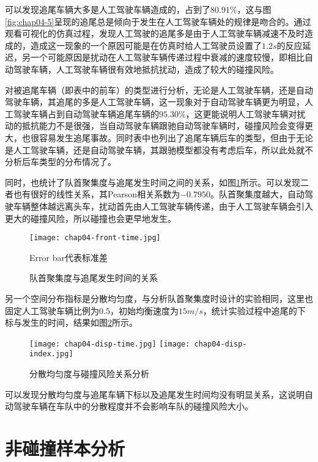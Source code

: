 可以发现追尾车辆大多是人工驾驶车辆造成的，占到了$80.91\%$，这与图\ref{fig:chap04-5}呈现的追尾总是倾向于发生在人工驾驶车辆处的规律是吻合的。通过观看可视化的仿真过程，发现人工驾驶的追尾多是由于人工驾驶车辆减速不及时造成的，造成这一现象的一个原因可能是在仿真时给人工驾驶员设置了$1.2s$的反应延迟，另一个可能原因是扰动在人工驾驶车辆传递过程中衰减的速度较慢，即相比自动驾驶车辆，人工驾驶车辆很有效地抵抗扰动，造成了较大的碰撞风险。

对被追尾车辆（即表中的前车）的类型进行分析，无论是人工驾驶车辆，还是自动驾驶车辆，其追尾的多是人工驾驶车辆，这一现象对于自动驾驶车辆更为明显，人工驾驶车辆占到自动驾驶车辆追尾车辆的$95.30\%$，这更能说明人工驾驶车辆对扰动的抵抗能力不是很强，当自动驾驶车辆跟驰自动驾驶车辆时，碰撞风险会变得更大，也很容易发生追尾事故。同时表中也列出了追尾车辆后车的类型，但由于无论是人工驾驶车辆，还是自动驾驶车辆，其跟驰模型都没有考虑后车，所以此处就不分析后车类型的分布情况了。

同时，也统计了队首聚集度与追尾发生时间之间的关系，如图\ref{fig:chap04-6}所示。可以发现二者也有很好的线性关系，其Pearson相关系数为$-0.7950$。队首聚集度越大，自动驾驶车辆整体越远离头车，扰动首先由人工驾驶车辆传递，由于人工驾驶车辆会引入更大的碰撞风险，所以碰撞也会更早地发生。

\begin{figure}
    \centering
    \texttt{[image: chap04-front-time.jpg]}
    \caption*{Error bar代表标准差}
    \caption{队首聚集度与追尾发生时间的关系}
    \label{fig:chap04-6}
\end{figure} 

另一个空间分布指标是分散均匀度，与分析队首聚集度时设计的实验相同，这里也固定人工驾驶车辆比例为$0.5$，初始均衡速度为$15m/s$，统计实验过程中追尾的下标与发生的时间，结果如图\ref{fig:chap04-7}所示。

\begin{figure}
    \centering
      {\texttt{[image: chap04-disp-time.jpg]}}
      {\texttt{[image: chap04-disp-index.jpg]}}
      \caption{分散均匀度与碰撞风险关系分析}
    \label{fig:chap04-7}
  \end{figure}

可以发现分散均匀度与追尾车辆下标以及追尾发生时间均没有明显关系，这说明自动驾驶车辆在车队中的分散程度并不会影响车队的碰撞风险大小。

\section{非碰撞样本分析}
\label{sec:4.3}

